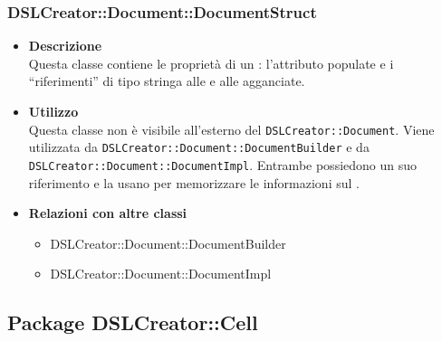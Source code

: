  \subsubsection{DSLCreator::Document::DocumentStruct}
                    \begin{itemize}
                        \item \textbf{Descrizione} \hfill \\
                            Questa classe contiene le proprietà di un : l'attributo populate e i ``riferimenti'' di tipo stringa alle  e alle  agganciate. 
                        \item \textbf{Utilizzo} \hfill \\
                            Questa classe non è visibile all'esterno del  \texttt{DSLCreator::Document}. Viene utilizzata da \texttt{DSLCreator::Document::DocumentBuilder} e da \texttt{DSLCrea\-tor::Document::DocumentImpl}. Entrambe possiedono un suo riferimento e la usano per memorizzare le informazioni sul .
                        \item \textbf{Relazioni con altre classi}
                            \begin{itemize}
                              \item DSLCreator::Document::DocumentBuilder
                              \item DSLCreator::Document::DocumentImpl
                            \end{itemize}
                    \end{itemize}

\subsection{Package DSLCreator::Cell}

